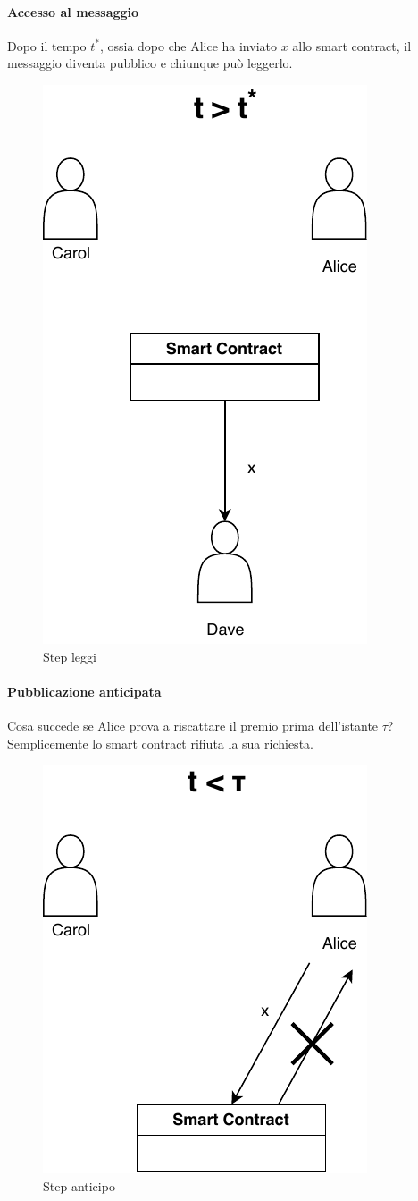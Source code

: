 \paragraph{Accesso al messaggio}
Dopo il tempo $ t^{*} $, ossia dopo che Alice ha inviato $ x $ allo smart contract,
il messaggio diventa pubblico e
chiunque può leggerlo.
\begin{figure}[H]
	\centering
	\includegraphics[width=0.27\linewidth]{images/chap_protocollo/base-leggi.pdf}
	\caption{Step leggi}
\end{figure}

\paragraph{Pubblicazione anticipata}
Cosa succede se Alice prova a riscattare il premio prima dell'istante $ \tau $?
Semplicemente lo smart contract rifiuta la sua richiesta.
\begin{figure}[H]
	\centering
	\includegraphics[width=0.3\linewidth]{images/chap_protocollo/base-anticipo.pdf}
	\caption{Step anticipo}
\end{figure}

